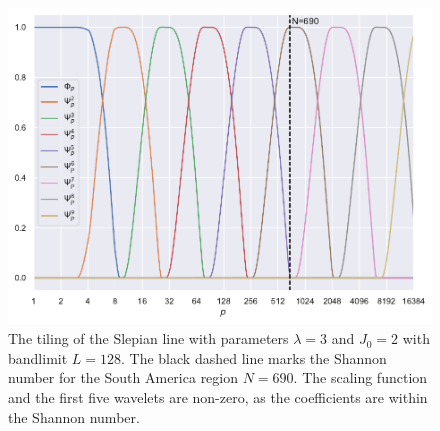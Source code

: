 \begin{figure}[htpb]
\centering\capstart{}
\includegraphics[width=\textwidth]{south_america_slepian_tiling_L128.pdf}
\caption[
The tiling of the Slepian line for the South America region
]{
The tiling of the Slepian line with parameters \(\lambda=3\) and \(J_{0}=2\) with bandlimit \(L=128\).
The black dashed line marks the Shannon number for the South America region \(N=690\).
The scaling function and the first five wavelets are non-zero, as the coefficients are within the Shannon number.
}\label{fig:chapter4_tiling}
\end{figure}
